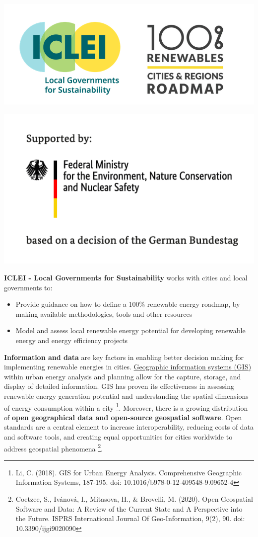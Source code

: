 \documentclass[
]{book}
\providecommand{\tightlist}{%
  \setlength{\itemsep}{0pt}\setlength{\parskip}{0pt}}
\begin{document}
\begin{center}\includegraphics[width=0.5\linewidth]{images/iclei_100re} \end{center}

\begin{center}\includegraphics[width=0.5\linewidth]{images/BMU_2018_supported_Web2x_en} \end{center}

\textbf{ICLEI - Local Governments for Sustainability} works with cities and local governments to:

\begin{itemize}
\tightlist
\item
  Provide guidance on how to define a 100\% renewable energy roadmap, by making available methodologies, tools and other resources
\item
  Model and assess local renewable energy potential for developing renewable energy and energy efficiency projects
\end{itemize}

\textbf{Information and data} are key factors in enabling better decision making for implementing renewable energies in cities. \href{https://www.usgs.gov/faqs/what-a-geographic-information-system-gis?qt-news_science_products=0\#qt-news_science_products}{Geographic information systems (GIS)} within urban energy analysis and planning allow for the capture, storage, and display of detailed information. GIS has proven its effectiveness in assessing renewable energy generation potential and understanding the spatial dimensions of energy consumption within a city \footnote{Li, C. (2018). GIS for Urban Energy Analysis. Comprehensive Geographic Information Systems, 187-195. doi: 10.1016/b978-0-12-409548-9.09652-4}. Moreover, there is a growing distribution of \textbf{open geographical data and open-source geospatial software}. Open standards are a central element to increase interoperability, reducing costs of data and software tools, and creating equal opportunities for cities worldwide to address geospatial phenomena \footnote{Coetzee, S., Ivánová, I., Mitasova, H., \& Brovelli, M. (2020). Open Geospatial Software and Data: A Review of the Current State and A Perspective into the Future. ISPRS International Journal Of Geo-Information, 9(2), 90. doi: 10.3390/ijgi9020090}.
\end{document}
